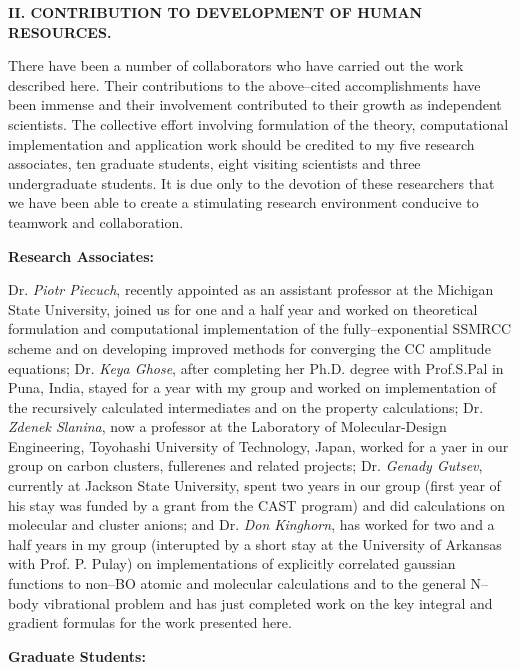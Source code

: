 \noindent
{\bf II.  CONTRIBUTION TO DEVELOPMENT OF HUMAN RESOURCES.}

There have been a number of collaborators who 
have carried out the work described here. Their
contributions to the above--cited accomplishments have 
been immense and their involvement contributed to their
growth as independent scientists. The collective 
effort involving formulation of the theory, computational
implementation and application work should be credited 
to my five research associates, ten graduate students,
eight visiting scientists and three undergraduate students.  
It is due only to the devotion of these researchers that
we have been able to create a stimulating research environment 
conducive to teamwork and collaboration.

\vspace{2mm}

\noindent
{\bf Research Associates:}

Dr. {\em Piotr Piecuch}, recently appointed as an 
assistant professor at the Michigan State University, joined us for
one and a half year and worked on theoretical formulation and 
computational implementation of the fully--exponential
SSMRCC scheme and on developing improved 
methods for converging the CC amplitude equations;  
Dr. {\em Keya Ghose}, 
after completing her Ph.D. degree with Prof.S.Pal in Puna, India,
stayed for a year with my group and 
worked on implementation of the recursively calculated
intermediates and on the property calculations;  
Dr. {\em  Zdenek Slanina}, 
now a professor at the Laboratory
of Molecular-Design Engineering,
Toyohashi University of Technology, Japan,
worked for a yaer in our group on carbon clusters, fullerenes and
related projects;  
Dr. {\em Genady Gutsev}, 
currently
at Jackson State University, 
spent two years in our group (first year of his stay was
funded by a grant from the CAST program) and did 
calculations on molecular and cluster anions; 
and Dr. {\em Don Kinghorn}, 
has worked for two and a half years in my group
(interupted by
a short stay at the University of Arkansas with Prof. P. Pulay) 
on implementations of explicitly correlated gaussian functions
to non--BO atomic and molecular calculations and 
to the general N--body vibrational problem and has just completed
work on the key integral and gradient formulas for the work 
presented here.

\vspace{2mm}

\noindent
{\bf Graduate Students:}

